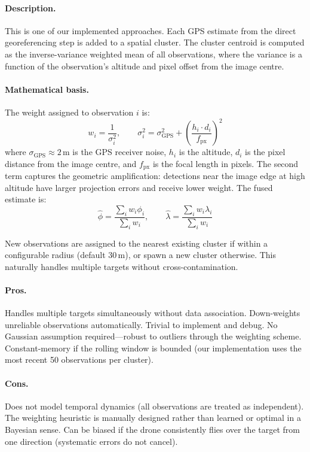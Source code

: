 \paragraph{Description.}
This is one of our implemented approaches.  Each GPS estimate from the direct georeferencing step is added to a spatial cluster.  The cluster centroid is computed as the inverse-variance weighted mean of all observations, where the variance is a function of the observation's altitude and pixel offset from the image centre.

\paragraph{Mathematical basis.}
The weight assigned to observation $i$ is:
\begin{equation}\label{eq:ivw}
  w_i = \frac{1}{\sigma_i^2}, \qquad
  \sigma_i^2 = \sigma_\mathrm{GPS}^2 + \left(\frac{h_i \cdot d_i}{f_\mathrm{px}}\right)^2
\end{equation}
where $\sigma_\mathrm{GPS} \approx 2$\,m is the GPS receiver noise, $h_i$ is the altitude, $d_i$ is the pixel distance from the image centre, and $f_\mathrm{px}$ is the focal length in pixels.  The second term captures the geometric amplification: detections near the image edge at high altitude have larger projection errors and receive lower weight.  The fused estimate is:
\begin{equation}
  \hat{\phi} = \frac{\sum_i w_i \phi_i}{\sum_i w_i}, \qquad
  \hat{\lambda} = \frac{\sum_i w_i \lambda_i}{\sum_i w_i}
\end{equation}

New observations are assigned to the nearest existing cluster if within a configurable radius (default 30\,m), or spawn a new cluster otherwise.  This naturally handles multiple targets without cross-contamination.

\paragraph{Pros.}
Handles multiple targets simultaneously without data association.  Down-weights unreliable observations automatically.  Trivial to implement and debug.  No Gaussian assumption required---robust to outliers through the weighting scheme.  Constant-memory if the rolling window is bounded (our implementation uses the most recent 50 observations per cluster).

\paragraph{Cons.}
Does not model temporal dynamics (all observations are treated as independent).  The weighting heuristic is manually designed rather than learned or optimal in a Bayesian sense.  Can be biased if the drone consistently flies over the target from one direction (systematic errors do not cancel).

